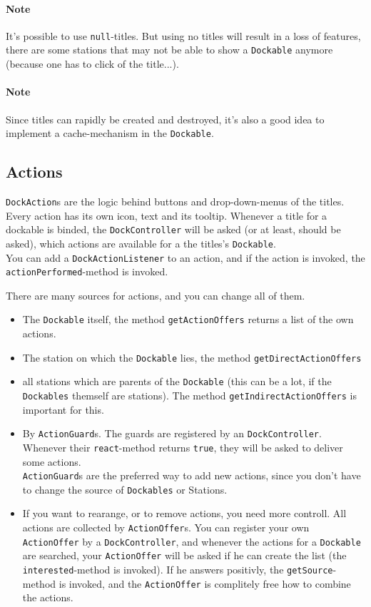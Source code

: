 \documentclass{article}
\begin{document}
\paragraph{Note} It's possible to use \verb!null!-titles. But using no titles will result in a loss of features, there are some stations that may not be able to show a \verb!Dockable! anymore (because one has to click of the title...).
\paragraph{Note} Since titles can rapidly be created and destroyed, it's also a good idea to implement a cache-mechanism in the \verb!Dockable!.

\subsection{Actions}
\verb!DockAction!s are the logic behind buttons and drop-down-menus of the titles. Every action has its own icon, text and its tooltip. Whenever a title for a dockable is binded, the \verb!DockController! will be asked (or at least, should be asked), which actions are available for a the titles's \verb!Dockable!. \\
You can add a \verb!DockActionListener! to an action, and if the action is invoked, the \verb!actionPerformed!-method is invoked.

There are many sources for actions, and you can change all of them.
\begin{itemize}
	\item The \verb!Dockable! itself, the method \verb!getActionOffers! returns a list of the own actions.
	\item The station on which the \verb!Dockable! lies, the method \verb!getDirectActionOffers!
	\item all stations which are parents of the \verb!Dockable! (this can be a lot, if the \verb!Dockables! themself are stations). The method \verb!getIndirectActionOffers! is important for this.
	\item By \verb!ActionGuard!s. The guards are registered by an \verb!DockController!. Whenever their \verb!react!-method returns \verb!true!, they will be asked to deliver some actions.\\
	\verb!ActionGuard!s are the preferred way to add new actions, since you don't have to change the source of \verb!Dockables! or Stations.
	\item If you want to rearange, or to remove actions, you need more controll. All actions are collected by \verb!ActionOffer!s. You can register your own \verb!ActionOffer! by a \verb!DockController!, and whenever the actions for a \verb!Dockable! are searched, your \verb!ActionOffer! will be asked if he can create the list (the \verb!interested!-method is invoked). If he answers positivly, the \verb!getSource!-method is invoked, and the \verb!ActionOffer! is complitely free how to combine the actions.
\end{itemize}
\end{document}
